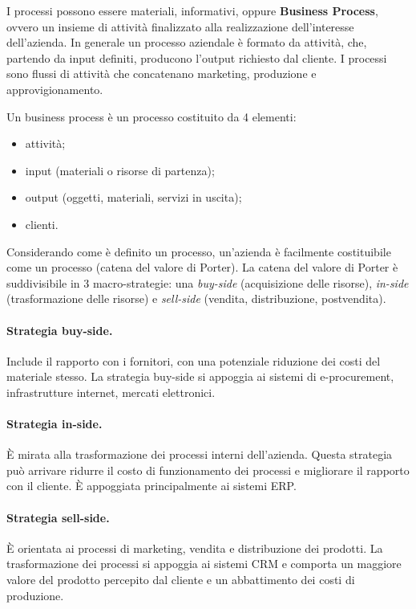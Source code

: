 \documentclass[a4paper, 11pt]{article}
\begin{document}
	I processi possono essere materiali, informativi, oppure \textbf{Business Process}, ovvero un insieme di attività finalizzato alla realizzazione dell'interesse dell'azienda. In generale un processo aziendale è formato da attività, che, partendo da input definiti, producono l'output richiesto dal cliente.  I processi sono flussi di attività che concatenano marketing, produzione e approvigionamento. 
	
	Un business process è un processo costituito da 4 elementi: \begin{itemize}
		\item attività;
		\item input (materiali o risorse di partenza);
		\item output (oggetti, materiali, servizi in uscita);
		\item clienti.
	\end{itemize}

	Considerando come è definito un processo, un'azienda è facilmente costituibile come un processo (catena del valore di Porter). La catena del valore di Porter è suddivisibile in 3 macro-strategie: una \textit{buy-side} (acquisizione delle risorse), \textit{in-side} (trasformazione delle risorse) e \textit{sell-side} (vendita, distribuzione, postvendita).
	
	\paragraph{Strategia buy-side.} Include il rapporto con i fornitori, con una potenziale riduzione dei costi del materiale stesso. La strategia buy-side si appoggia ai sistemi di e-procurement, infrastrutture internet, mercati elettronici.
	
	\paragraph{Strategia in-side.} È mirata alla trasformazione dei processi interni dell'azienda. Questa strategia può arrivare  ridurre il costo 	di funzionamento dei processi e migliorare il rapporto con il cliente. È appoggiata principalmente ai sistemi ERP.
	
	\paragraph{Strategia sell-side.}È orientata ai processi di marketing, vendita e distribuzione dei prodotti. La trasformazione dei processi si appoggia ai sistemi CRM e comporta un maggiore valore del prodotto percepito dal cliente e un abbattimento dei costi di produzione. 
	
\end{document}
